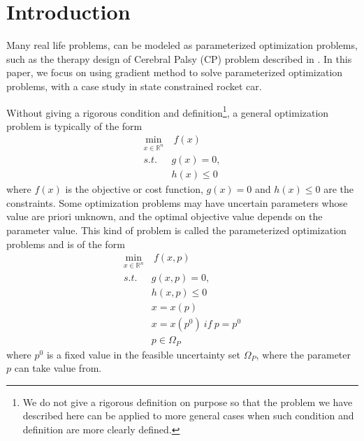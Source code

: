 \documentclass  [
  paper    = a4,
  BCOR     = 10mm,
  twoside,
  fontsize = 12pt,
  fleqn,
  toc      = bibnumbered,
  toc      = listofnumbered,
  numbers  = noendperiod,
  headings = normal,
  listof   = leveldown,
  version  = 3.03
]                                       {scrreprt}
\newcommand{\<}{\langle}
\renewcommand{\>}{\rangle}
\begin{document}
   
   \tableofcontents
    \let\clearpage\relax
   \newpage
   
   
   \chapter{Introduction}
   
   Many real life problems, can be modeled as parameterized optimization problems, such as the therapy design of Cerebral Palsy (CP) problem described in \cite{MatSch22}. In this paper, we focus on using gradient method to solve parameterized optimization problems, with a case study in state constrained rocket car. 
   
   Without giving a rigorous condition and definition\footnote{We do not give a rigorous definition on purpose so that the problem we have described here can be applied to more general cases when such condition and definition are more clearly defined.},  a general optimization problem is typically of the form
   \begin{equation}
   \begin{aligned}
      \underset{x \in \mathbb{R}^n}{\text{min}}  & 	\   f(x) \\
   s.t.  \  \  \ & g(x) = 0, \\ 
   &  h(x)  \leq  0 
   \end{aligned}
   \label{GeneralMin}
   \end{equation}
   where $f(x)$ is the objective or cost function, $g(x) = 0$ and $h(x)  \leq  0$ are the constraints. Some optimization problems may have uncertain parameters whose value are priori unknown, and the optimal objective value depends on the parameter value. This kind of problem is called the parameterized optimization problems and is of the form 
   \begin{equation}
   \begin{aligned}
   \underset{x \in \mathbb{R}^n}{\text{min}}  & 	\    f(x, p) \\
   s.t.  \  \  \ & g(x, p) = 0, \\ 
   &  h(x,p)  \leq  0  \\ 
   & x = x(p) \\
   & x = x(p^0) \  if \  p = p^0 \\
   & p \in \Omega_P		
   \end{aligned}
   \label{ParaMin}
   \end{equation}
   where $p^0$ is a fixed value in the feasible uncertainty set $\Omega_P$, where the parameter $p$ can take value from.
   
\end{document}

